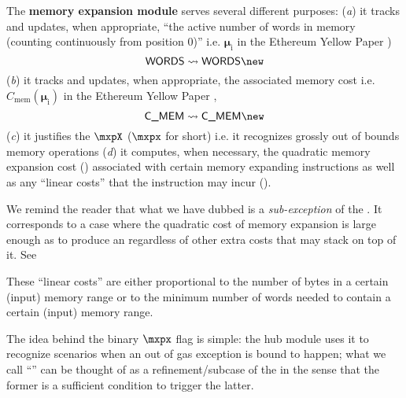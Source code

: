 The \textbf{memory expansion module} serves several different purposes:
(\emph{a})
it tracks and updates, when appropriate, ``the active number of words in memory (counting continuously from position $0$)'' i.e. $\bm{\mu}_\text{i}$ in the Ethereum Yellow Paper )
\[
	\memSize\rightsquigarrow\memSize\new
\]
(\emph{b})
it tracks and updates, when appropriate, the associated memory cost i.e. $C_\text{mem}(\bm{\mu}_\text{i})$ in the Ethereum Yellow Paper ,
\[
	\expCost\rightsquigarrow\expCost\new
\]
(\emph{c})
it justifies the $\mxpX$ ($\mxpx$ for short) i.e. it recognizes grossly out of bounds memory operations
(\emph{d})
it computes, when necessary, the quadratic memory expansion cost
(\mxpQuadGas) associated with certain memory expanding instructions as well as any ``linear costs'' that the instruction may incur
(\mxpLinGas).

\saNote{} We remind the reader that what we have dubbed \mxpxSH{} is a \emph{sub-exception} of the \oogxSH{}. It corresponds to a case where the quadratic cost of memory expansion is large enough as to produce an \oogxSH{} regardless of other extra costs that may stack on top of it. See

\saNote{} These ``linear costs'' are either proportional to the number of bytes in a certain (input) memory range or to the minimum number of  words needed to contain a certain (input) memory range.

The idea behind the binary $\mxpx$ flag is simple: the hub module uses it to recognize scenarios when an out of gas exception is bound to happen; what we call ``\mxpxSH{}'' can be thought of as a refinement/subcase of the \oogxSH{} in the sense that the former is a sufficient condition to trigger the latter.



